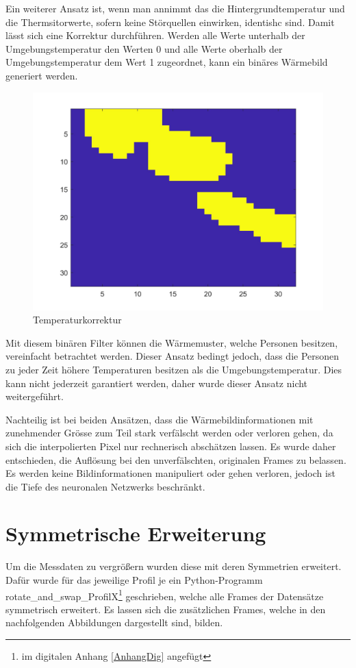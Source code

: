 Ein weiterer Ansatz ist, wenn man annimmt das die Hintergrundtemperatur und die Thermsitorwerte, sofern keine Störquellen einwirken, identishc sind.  Damit lässt sich eine Korrektur durchführen. Werden alle Werte unterhalb der Umgebungstemperatur den Werten 0 und alle Werte oberhalb der Umgebungstemperatur dem Wert 1 zugeordnet, kann ein binäres Wärmebild generiert werden. 

\begin{figure}[H]
	\centering
	\includegraphics[width=0.5\linewidth]{fig/interpol_3}
    \caption[Temperaturkorrektur]{Temperaturkorrektur}
   \label{fig:interpol3}
\end{figure}

Mit diesem binären Filter können die Wärmemuster, welche Personen besitzen, vereinfacht betrachtet werden. Dieser Ansatz bedingt jedoch, dass die Personen zu jeder Zeit höhere Temperaturen besitzen als die Umgebungstemperatur. Dies kann nicht jederzeit garantiert werden, daher wurde dieser Ansatz nicht weitergeführt.

Nachteilig ist bei beiden Ansätzen, dass die Wärmebildinformationen mit zunehmender Grösse zum Teil stark verfälscht werden oder verloren gehen, da sich die interpolierten Pixel nur rechnerisch abschätzen lassen. Es wurde daher entschieden, die Auflösung bei den unverfälschten, originalen Frames zu belassen. Es werden keine Bildinformationen manipuliert  oder gehen verloren, jedoch ist die Tiefe des neuronalen Netzwerks beschränkt.

\section{Symmetrische Erweiterung}

Um die Messdaten zu vergrößern wurden diese mit deren Symmetrien erweitert. Dafür wurde für das jeweilige Profil je ein Python-Programm rotate\_and\_swap\_ProfilX\footnote{im digitalen Anhang \ref{AnhangDig} angefügt}  geschrieben, welche alle Frames der Datensätze symmetrisch erweitert.  Es lassen sich die zusätzlichen Frames, welche in den nachfolgenden Abbildungen dargestellt sind, bilden.

